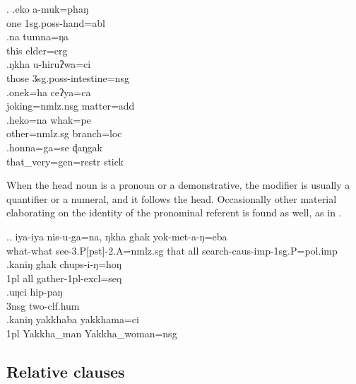 \ex. \ag.eko a-muk=phaŋ\\
one {\sc 1sg.poss-}hand{\sc =abl}\\
 
\bg.na    tumna=ŋa\\
this elder{\sc =erg}\\
 
\bg.ŋkha u-hiruʔwa=ci\\
those {\sc 3sg.poss-}intestine{\sc =nsg}\\
 
\bg.onek=ha      ceʔya=ca\\
joking{\sc =nmlz.nsg} matter{\sc =add}\\
 
\bg.heko=na         whak=pe\\
other{\sc =nmlz.sg} branch{\sc =loc}\\
 
\bg.honna=ga=se                          ɖaŋgak\\
that\_very{\sc =gen=restr} stick\\
 


When the head noun is a pronoun or  a demonstrative, the modifier is usually a quantifier or a numeral, and it follows the head. Occasionally other material elaborating on the identity of the pronominal referent is found as well, as in \Next[d].

\ex.\label{iyaiyadem}\ag.    iya-iya                nis-u-ga=na,                  ŋkha ghak yok-met-a-ŋ=eba\\
what-what see{\sc -3.P[pst]-2.A=nmlz.sg} that all search{\sc -caus-imp-1sg.P=pol.imp}\\
 
\bg.kaniŋ ghak chups-i-ŋ=hoŋ\\
{\sc 1pl} all gather{\sc -1pl-excl=seq}\\
 
\bg.uŋci hip-paŋ\\
{\sc 3nsg} two{\sc -clf.hum}\\
\bg.kaniŋ yakkhaba yakkhama=ci\\
{\sc 1pl} Yakkha\_man Yakkha\_woman{\sc =nsg}\\
              
			  
\subsection{Relative clauses}\label{str-np-rc}

